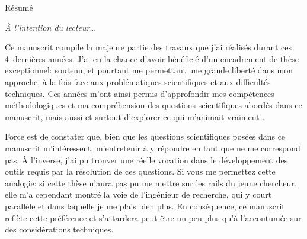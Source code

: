 
\thispagestyle{thesis-empty}

Résumé

\begin{comment}

\clearpage
\thispagestyle{thesis-empty}

\section*{Remerciements}
\label{sec:thanks}

la colloc étendu: théo, thomas, arthur, rémi, rémy, clément, sarah
parler du confinement ?
les potos: benjamin, marie, charlie, paul, jessie, piwi

la mifa

mon comité de thèse ? Sakina, Daniele

le 426 le meilleur bureau, tous les autres doctorants et post-doctorants et stagiaires
c'est quand même vachement plus fun avec elleux.

l'équipe admin du labo, bigup
\end{comment}

\clearpage
\thispagestyle{thesis-empty}

\vspace*{5ex}
\par\addvspace{\beforesecskip}\addvspace{\baselineskip}
\par\noindent\textit{À l'intention du lecteur\dots}\par
\vspace{\aftersecskip}

Ce manuscrit compile la majeure partie des travaux que j'ai réalisés durant ces 4~dernières années.
J'ai eu la chance d'avoir bénéficié d'un encadrement de thèse exceptionnel: soutenu, et pourtant me permettant une grande liberté dans mon approche, à la fois face aux problématiques scientifiques et aux difficultés techniques.
Ces années m'ont ainsi permis d'approfondir mes compétences méthodologiques et ma compréhension des questions scientifiques abordés dans ce manuscrit, mais aussi et surtout d'explorer ce qui m'animait vraiment .

Force est de constater que, bien que les questions scientifiques posées dans ce manuscrit m'intéressent, m'entretenir à y répondre en tant que  ne me correspond pas.
À l'inverse, j'ai pu trouver une réelle vocation dans le développement des outils requis par la résolution de ces questions.
Si vous me permettez cette analogie: si cette thèse n'aura pas pu me mettre sur les rails du jeune chercheur, elle m'a cependant montré la voie de l'ingénieur de recherche, qui y court parallèle et dans laquelle je me plais bien plus.
En conséquence, ce manuscrit reflète cette préférence et s'attardera peut-être un peu plus qu'à l'accoutumée sur des considérations techniques.

